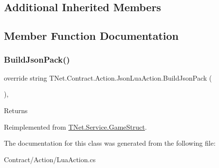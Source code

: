 \subsection*{Additional Inherited Members}


\subsection{Member Function Documentation}
\mbox{\label{class_t_net_1_1_contract_1_1_action_1_1_json_lua_action_a3b5e5d5a35643dfc2a610735729c8ee4}} 
\subsubsection{\texorpdfstring{Build\+Json\+Pack()}{BuildJsonPack()}}
{\footnotesize\ttfamily override string T\+Net.\+Contract.\+Action.\+Json\+Lua\+Action.\+Build\+Json\+Pack (\begin{DoxyParamCaption}{ }\end{DoxyParamCaption})\hspace{0.3cm}{\ttfamily [protected]}, {\ttfamily [virtual]}}





\begin{DoxyReturn}{Returns}

\end{DoxyReturn}


Reimplemented from \mbox{\hyperlink{class_t_net_1_1_service_1_1_game_struct_a629b46371ae918050fc7c69aee789d92}{T\+Net.\+Service.\+Game\+Struct}}.



The documentation for this class was generated from the following file\+:\begin{DoxyCompactItemize}
\item 
Contract/\+Action/Lua\+Action.\+cs\end{DoxyCompactItemize}
